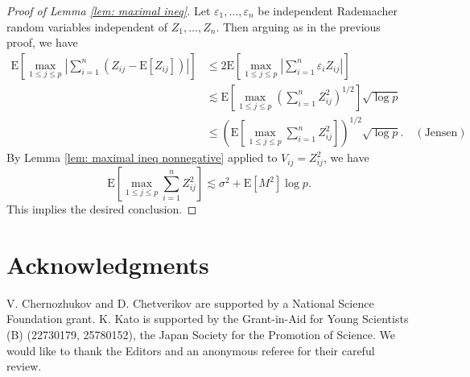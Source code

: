 \documentclass[11pt,reqno]{amsart}
\theoremstyle{definition}
\newcommand{\eps}{\varepsilon}
\newcommand{\Ep}{{\mathrm{E}}}
\begin{document}
\begin{proof}[Proof of Lemma \ref{lem: maximal ineq}]
Let $\eps_{1},\dots,\eps_{n}$ be independent Rademacher random variables independent of $Z_{1},\dots,Z_{n}$. Then arguing as in the previous proof, we have
\begin{align*}
\Ep [\max_{1 \leq j \leq p} | {\textstyle \sum}_{i=1}^{n} (Z_{ij} - \Ep [Z_{ij}]) | ]
&\leq 2 \Ep [\max_{1 \leq j \leq p} | {\textstyle \sum}_{i=1}^{n} \eps_{i}Z_{ij} | ] \\
&\lesssim \Ep [ \max_{1 \leq j \leq p} ( {\textstyle \sum}_{i=1}^{n} Z_{ij}^{2} )^{1/2} ]  \sqrt{\log p} \\
&\leq (\Ep [ \max_{1 \leq j \leq p} {\textstyle \sum}_{i=1}^{n} Z_{ij}^{2}  ] )^{1/2} \sqrt{\log p}. \quad (\text{Jensen})
\end{align*}
By Lemma \ref{lem: maximal ineq nonnegative} applied to $V_{ij} = Z_{ij}^{2}$, we have
\begin{equation*}
\Ep [ \max_{1 \leq j \leq p} {\textstyle \sum}_{i=1}^{n} Z_{ij}^{2}  ] \lesssim \sigma^{2} + \Ep [ M^{2} ] \log p.
\end{equation*}
This implies the desired conclusion.
\end{proof}

\section*{Acknowledgments}
V. Chernozhukov and D. Chetverikov  are supported by a National Science Foundation grant. K. Kato is supported by the Grant-in-Aid for Young Scientists (B) (22730179, 25780152), the Japan Society for the Promotion of Science. We would like to thank the Editors and an anonymous referee for their careful review.
\end{document}
